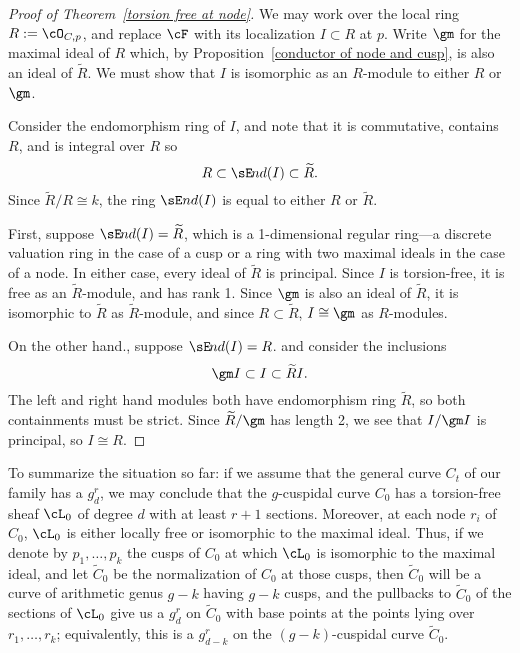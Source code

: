 \begin{proof}[Proof of Theorem~\ref{torsion free at node}] We may work over the local ring $R := \cO_{C,p}$, and replace $\cF$ with 
its localization $I\subset R$ at $p$. Write
$\gm$ for the maximal ideal of $R$ which, by Proposition~\ref{conductor of node and cusp}, is also an ideal of $\widetilde R$.
We must show that $I$ is isomorphic as an $R$-module to either $R$ or $\gm$.

\def\sEnd{{\sE \kern-1pt nd}}

Consider the endomorphism ring of $I$, and note that it is commutative, contains $R$,  and is integral over $R$ so 
$$
R \subset \sEnd(I) \subset \widetilde R.
$$
Since
$\widetilde R/R \cong k$, the ring $\sE nd(I)$ is equal to either 
$R$ or $\widetilde R$. 

First, suppose
$\sEnd(I)=\widetilde R$, which is a 1-dimensional regular ring---a discrete valuation ring in the case of a cusp
or a ring with two maximal ideals in the case of a node. In either case, every ideal of $\widetilde R$ is principal.
 Since $I$ is torsion-free, it is free as an 
$\widetilde R$-module, and has rank 1. Since $\gm$ is also an ideal of $\widetilde R$, it is isomorphic to $\widetilde R$
as $\widetilde R$-module, and since $R\subset \widetilde R$,
$I \cong \gm$ as $R$-modules.

On the other hand., suppose
$\sEnd(I)=R$.
 and consider the inclusions
$$
\gm I \subset I \subset \widetilde R I.
$$
The left and right hand modules both have endomorphism ring $\widetilde R$,
so both containments must be strict. Since $\widetilde R/\gm$ has length 2,
we see that $I/\gm I$ is principal, so $I\cong R$.
\end{proof}

To summarize the situation so far: if we assume that the general curve $C_t$ of our family has a $g^r_d$, we may conclude that the $g$-cuspidal curve $C_0$ has a torsion-free sheaf $\cL_0$ of degree $d$ with at least $r+1$ sections. 
Moreover, at each node $r_i$ of $C_0$, $\cL_0$ is either locally free or isomorphic to the maximal ideal. Thus, if we denote by $p_1,\dots, p_k$ the cusps of $C_0$ at which $\cL_0$ is isomorphic to the maximal ideal, and let $\widetilde C_0$ be the normalization of $C_0$ at those cusps, then $\widetilde C_0$ will be a curve of arithmetic genus $g-k$ having $g-k$ cusps, and
the pullbacks to $\widetilde C_0$ of the sections of $\cL_0$ give us a $g^r_d$ on $\widetilde C_0$ with base points at the points lying over $r_1,\dots,r_k$; equivalently, this is a $g^r_{d-k}$ on the $(g-k)$-cuspidal curve  $\widetilde C_0$.



